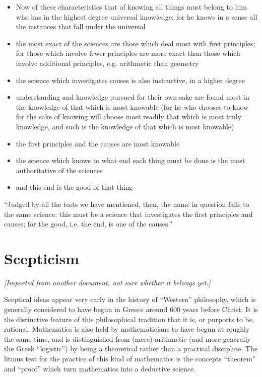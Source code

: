 \documentclass{rbjk}
\begin{document}
\begin{article}
\begin{itemize}
\item Now of these characteristics that of knowing all things must belong to him who has in the highest degree universal knowledge; for he knows in a sense all the instances that fall under the universal
\item the most exact of the sciences are those which deal most with first principles; for those which involve fewer principles are more exact than those which involve additional principles, e.g. arithmetic than geometry
\item the science which investigates causes is also instructive, in a higher degree
\item understanding and knowledge pursued for their own sake are found most in the knowledge of that which is most knowable (for he who chooses to know for the sake of knowing will choose most readily that which is most truly knowledge, and such is the knowledge of that which is most knowable)
\item the first principles and the causes are most knowable
\item the science which knows to what end each thing must be done is the most authoritative of the sciences
\item and this end is the good of that thing
\end{itemize}

``Judged by all the tests we have mentioned, then, the name in question falls to the same science; this must be a science that investigates the first principles and causes; for the good, i.e. the end, is one of the causes.''

\section{Scepticism}\label{SCEPTICISM}

{\it[Imported from another document, not sure whether it belongs yet.]}

Sceptical ideas appear very early in the history of ``Western'' philosophy, which is generally considered to have begun in Greece around 600 years before Christ.
It is the distinctive feature of this philosophical tradition that it is, or purports to be, rational.
Mathematics is also held by mathematicians to have begun at roughly the same time, and is distinguished from (mere) arithmetic (and more generally the Greek ``logistic'') by being a theoretical rather than a practical discipline.
The litmus test for the practice of this kind of mathematics is the concepts ``theorem'' and ``proof'' which turn mathematics into a deductive science.


\end{article}
\end{document}
